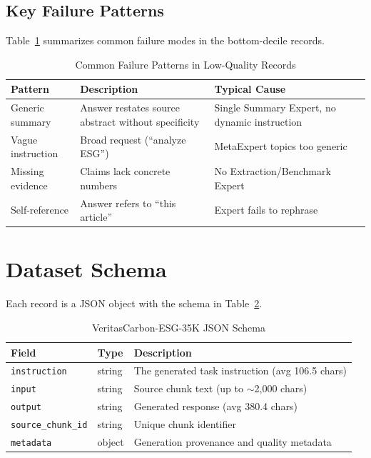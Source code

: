 \documentclass[sigconf,nonacm]{acmart}
\begin{document}
\subsection{Key Failure Patterns}

Table~\ref{tab:failure} summarizes common failure modes in the bottom-decile records.

\begin{table}[h]
\centering
\caption{Common Failure Patterns in Low-Quality Records}
\label{tab:failure}
\small
\begin{tabular}{@{}p{2.5cm}p{4.5cm}p{3.5cm}@{}}
\toprule
\textbf{Pattern} & \textbf{Description} & \textbf{Typical Cause} \\
\midrule
Generic summary & Answer restates source abstract without specificity & Single Summary Expert, no dynamic instruction \\
Vague instruction & Broad request (``analyze ESG'') & MetaExpert topics too generic \\
Missing evidence & Claims lack concrete numbers & No Extraction/Benchmark Expert \\
Self-reference & Answer refers to ``this article'' & Expert fails to rephrase \\
\bottomrule
\end{tabular}
\end{table}

\section{Dataset Schema}

Each record is a JSON object with the schema in Table~\ref{tab:schema}.

\begin{table}[h]
\centering
\caption{VeritasCarbon-ESG-35K JSON Schema}
\label{tab:schema}
\small
\begin{tabular}{@{}p{2.5cm}p{1.5cm}p{6.5cm}@{}}
\toprule
\textbf{Field} & \textbf{Type} & \textbf{Description} \\
\midrule
\texttt{instruction} & string & The generated task instruction (avg 106.5 chars) \\
\texttt{input} & string & Source chunk text (up to $\sim$2,000 chars) \\
\texttt{output} & string & Generated response (avg 380.4 chars) \\
\texttt{source\_chunk\_id} & string & Unique chunk identifier \\
\texttt{metadata} & object & Generation provenance and quality metadata \\
\bottomrule
\end{tabular}
\end{table}
\end{document}
